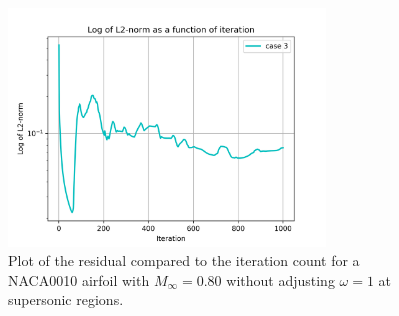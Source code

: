 \documentclass[12pt]{article}
\theoremstyle{definition}
\begin{document}
\begin{figure}
    \centering
    \includegraphics[width=0.75\textwidth,height=\textwidth,keepaspectratio]{images/residual_history-4-no-omega.png}
    \caption{Plot of the residual compared to the iteration count for a NACA0010 airfoil with $M_\infty = 0.80$ without adjusting $\omega = 1$ at supersonic regions.}
    \label{fig:res_his-4-no-omega}
\end{figure}


\vspace{1cm}
\end{document}
